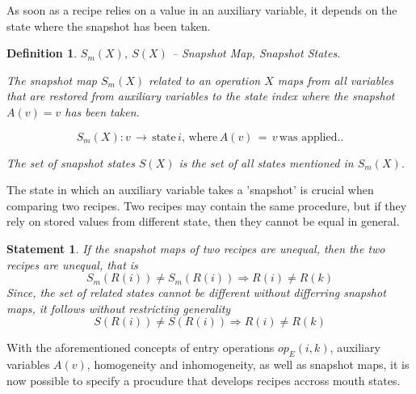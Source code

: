 \documentclass[12pt,a4paper]{scrartcl}
\newtheorem{definition}{Definition}
\newtheorem{statement}{Statement}
\begin{document}
As soon as a recipe relies on a value in an auxiliary variable, it depends on
the state where the snapshot has been taken.  
\begin{definition} $S_m(X)$,
    $S(X)$ -- Snapshot Map, Snapshot States.

    The snapshot map $S_m(X)$ related to an operation $X$ maps from all
    variables that are restored from auxiliary variables to the state index
    where the snapshot $A(v)=v$ has been taken.
    
    \begin{equation}
        \label{eq:snapshot-map}
        S_m(X):  v\,\rightarrow\,\mbox{state}\,i,\,\mbox{where}\,A(v)\,=\,v\,\mbox{was applied.}.
    \end{equation}

    The set of snapshot states $S(X)$ is the set of all states mentioned in
    $S_m(X)$.

\end{definition}
The state in which an auxiliary variable takes a 'snapshot' is crucial when
comparing two recipes. Two recipes may contain the same procedure, but if they rely on
stored values from different state, then they cannot be equal in general.
\begin{statement}
   If the snapshot maps of two recipes are unequal, then the two recipes
   are unequal, that is
   \begin{equation} \label{eq:snapshot-map-difference}
       S_m(R(i)) \neq S_m(R(i)) \Rightarrow R(i) \neq R(k)
   \end{equation}
   Since, the set of related states cannot be different without differring 
   snapshot maps, it follows without restricting generality
   \begin{equation} \label{eq:snapshot-map-difference2}
       S(R(i)) \neq S(R(i)) \Rightarrow R(i) \neq R(k)
   \end{equation}
\end{statement}
With the aforementioned concepts of entry operations $op_E(i,k)$, auxiliary
variables $A(v)$, homogeneity and inhomogeneity, as well as snapshot maps,
it is now possible to specify a procudure that develops recipes accross
mouth states.
\end{document}
